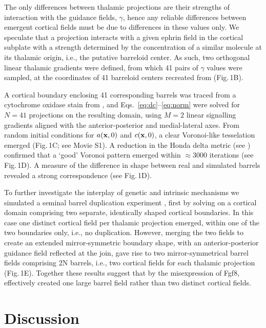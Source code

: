 \documentclass[9pt,lineno]{elife}
\begin{document}
The only differences between thalamic projections are their strengths of
interaction with the guidance fields, $\gamma$, hence any reliable differences
between emergent cortical fields must be due to differences in these values
only. We speculate that a projection interacts with a given ephrin field in
the cortical subplate with a strength determined by the concentration of a
similar molecule at its thalamic origin, i.e., the putative barreloid
center. As such, two orthogonal linear thalamic gradients were defined, from
which 41 pairs of $\gamma$ values were sampled, at the coordinates of 41
barreloid centers recreated from \citealp{haidarliu_size_2001} (Fig.\,1B).

A cortical boundary enclosing 41 corresponding barrels was traced from a
cytochrome oxidase stain from \cite{zheng_signal_2001}, and
Eqs.~\ref{eq:dc}--\ref{eq:norm} were solved for $N=41$ projections on the
resulting domain, using $M=2$ linear signalling gradients aligned with the
anterior-posterior and medial-lateral axes. From random initial conditions for
$a({\bf x},0)$ and $c({\bf x},0)$, a clear Voronoi-like tesselation emerged
(Fig.\,1C; see Movie S1). A reduction in the Honda delta metric (see
\citealp{senft_mouse_1991}) confirmed that a `good' Voronoi pattern emerged
within $\approx 3000$ iterations (see Fig.\,1D). A measure of the difference
in shape between real and simulated barrels revealed a strong correspondence
(see Fig.\,1D).

To further investigate the interplay of genetic and intrinsic mechanisms we
simulated a seminal barrel duplication experiment
\citep{shimogori_fibroblast_2005}, first by solving on a cortical domain
comprising two separate, identically shaped cortical boundaries. In this case
one distinct cortical field per thalamic projection emerged, within one of the
two boundaries only, i.e., no duplication. However, merging the two fields to
create an extended mirror-symmetric boundary shape, with an anterior-posterior
guidance field reflected at the join, gave rise to two mirror-symmetrical
barrel fields comprising 2N barrels, i.e., two cortical fields for each
thalamic projection (Fig.\,1E). Together these results suggest that by the
misexpression of Fgf8, \cite{shimogori_fibroblast_2005}
effectively created one large barrel field rather than two distinct cortical
fields.

\section{Discussion}
\end{document}
